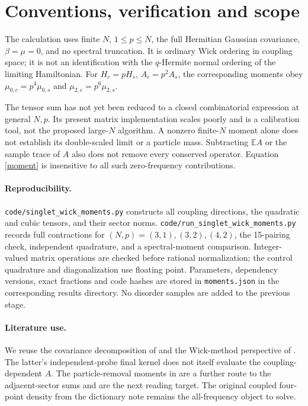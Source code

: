 \documentclass[11pt,a4paper]{article}
\newcommand{\E}{\mathbb E}
\begin{document}
\section{Conventions, verification and scope}
The calculation uses finite $N$, $1\le p\le N$, the full Hermitian
Gaussian covariance, $\beta=\mu=0$, and no spectral truncation. It is
ordinary Wick ordering in coupling space; it is not an identification
with the $q$-Hermite normal ordering of the limiting Hamiltonian.
For $H_c=pH_s$, $A_c=p^2A_s$, the corresponding moments obey
$\mu_{0,c}=p^4\mu_{0,s}$ and $\mu_{2,c}=p^6\mu_{2,s}$.

\newpage
The tensor sum has not yet been reduced to a closed combinatorial
expression at general $N,p$. Its present matrix implementation scales
poorly and is a calibration tool, not the proposed large-$N$ algorithm.
A nonzero finite-$N$ moment alone does not establish its double-scaled
limit or a particle mass. Subtracting $\E A$ or the sample trace of $A$
also does not remove every conserved operator. Equation \eqref{moment}
is insensitive to all such zero-frequency contributions.

\paragraph{Reproducibility.}
\texttt{code/singlet\_wick\_moments.py} constructs all coupling directions,
the quadratic and cubic tensors, and their sector norms.
\texttt{code/run\_singlet\_wick\_moments.py} records full contractions
for $(N,p)=(3,1),(3,2),(4,2)$, the 15-pairing check, independent
quadrature, and a spectral-moment comparison. Integer-valued matrix
operations are checked before rational normalization; the control
quadrature and diagonalization use floating point. Parameters, dependency
versions, exact fractions and code hashes are stored in
\texttt{moments.json} in the corresponding results directory.
No disorder samples are added to the previous stage.

\paragraph{Literature use.}
We reuse the covariance decomposition of \cite{kota} and the Wick-method
perspective of \cite{tt}. The latter's independent-probe final kernel
does not itself evaluate the coupling-dependent $A$. The particle-removal
moments in \cite{kv} are a further route to the adjacent-sector sums and
are the next reading target. The original coupled four-point density
from the dictionary note remains the all-frequency object to solve.
\end{document}
